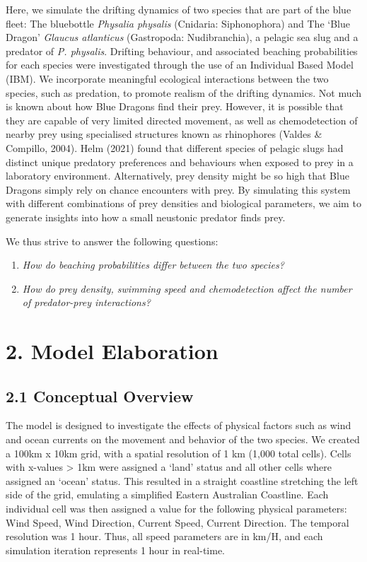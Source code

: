 \documentclass[
]{article}
\begin{document}
Here, we simulate the drifting dynamics of two species that are part of
the blue fleet: The bluebottle \emph{Physalia physalis} (Cnidaria:
Siphonophora) and The `Blue Dragon' \emph{Glaucus atlanticus}
(Gastropoda: Nudibranchia), a pelagic sea slug and a predator of
\emph{P. physalis}. Drifting behaviour, and associated beaching
probabilities for each species were investigated through the use of an
Individual Based Model (IBM). We incorporate meaningful ecological
interactions between the two species, such as predation, to promote
realism of the drifting dynamics. Not much is known about how Blue
Dragons find their prey. However, it is possible that they are capable
of very limited directed movement, as well as chemodetection of nearby
prey using specialised structures known as rhinophores (Valdes \&
Compillo, 2004). Helm (2021) found that different species of pelagic
slugs had distinct unique predatory preferences and behaviours when
exposed to prey in a laboratory environment. Alternatively, prey density
might be so high that Blue Dragons simply rely on chance encounters with
prey. By simulating this system with different combinations of prey
densities and biological parameters, we aim to generate insights into
how a small neustonic predator finds prey.

We thus strive to answer the following questions:

\begin{enumerate}
\def\labelenumi{\arabic{enumi}.}
\item
  \emph{How do beaching probabilities differ between the two species?}
\item
  \emph{How do prey density, swimming speed and chemodetection affect
  the number of predator-prey interactions?}
\end{enumerate}

\hypertarget{model-elaboration}{%
\section{2. Model Elaboration}\label{model-elaboration}}

\hypertarget{conceptual-overview}{%
\subsection{2.1 Conceptual Overview}\label{conceptual-overview}}

The model is designed to investigate the effects of physical factors
such as wind and ocean currents on the movement and behavior of the two
species. We created a 100km x 10km grid, with a spatial resolution of 1
km (1,000 total cells). Cells with x-values \textgreater{} 1km were
assigned a `land' status and all other cells where assigned an `ocean'
status. This resulted in a straight coastline stretching the left side
of the grid, emulating a simplified Eastern Australian Coastline. Each
individual cell was then assigned a value for the following physical
parameters: Wind Speed, Wind Direction, Current Speed, Current
Direction. The temporal resolution was 1 hour. Thus, all speed
parameters are in km/H, and each simulation iteration represents 1 hour
in real-time.
\end{document}
